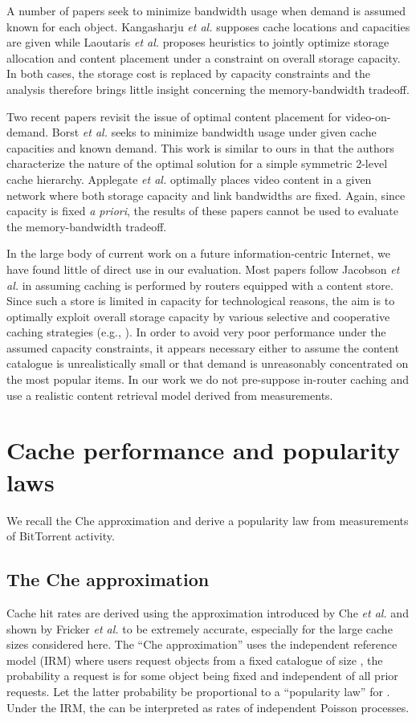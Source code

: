 \documentclass [11pt]{article}
\def\etal{{\em et al. }}
\begin{document}
A number of papers seek to minimize bandwidth usage when demand is assumed known for each object. Kangasharju \etal \cite{KRR01} supposes cache locations and capacities are given while Laoutaris \etal \cite{LZS05} proposes heuristics to jointly optimize storage allocation and content placement under a constraint on overall storage capacity. In both cases, the storage cost is replaced by capacity constraints and the analysis therefore brings little insight concerning the memory-bandwidth tradeoff.

Two recent papers revisit the issue of optimal content placement for video-on-demand. Borst \etal \cite{BGW10} seeks to minimize bandwidth usage under given cache capacities and known demand. This work is similar to ours in that the authors characterize the nature of the optimal solution for a simple symmetric 2-level cache hierarchy. Applegate \etal \cite{Applegate2010} optimally places video content in a given network where both storage capacity and link bandwidths are fixed. Again, since capacity is fixed \emph{a priori}, the results of these papers cannot be used to evaluate the memory-bandwidth tradeoff. 
  
In the large body of current work on a future information-centric Internet, we have found little of direct use in our evaluation. Most papers follow Jacobson \etal \cite{JSTP09} in assuming caching is performed by routers equipped with a content store. Since such a store is limited in capacity for technological reasons, the aim is to optimally exploit overall storage capacity by various selective and cooperative caching strategies (e.g., \cite{LS11, RR12, CHPP12}).  In order to avoid very poor performance under the assumed capacity constraints, it appears necessary either to assume the content catalogue is unrealistically small or that demand is unreasonably concentrated on the most popular items. In our work we do not pre-suppose in-router caching and use a realistic content retrieval model derived from measurements. 



\section{Cache performance and popularity laws}
\label{sec:Chepop}

We recall the Che approximation and derive a popularity law from measurements of BitTorrent activity.
\subsection{The Che approximation}
\label{sec:Che}
Cache hit rates are derived using the approximation introduced by Che \etal \cite{CTW02} and shown by Fricker \etal \cite{FRR12} to be extremely accurate, especially for the large cache sizes considered here. 
The ``Che approximation'' uses the independent reference model (IRM) where users request objects from a fixed catalogue of size , the probability a request is for some object  being fixed and independent of all prior requests. Let the latter probability be proportional to a ``popularity law''  for . Under the IRM, the  can be interpreted as rates of independent Poisson processes. 
\end{document}
